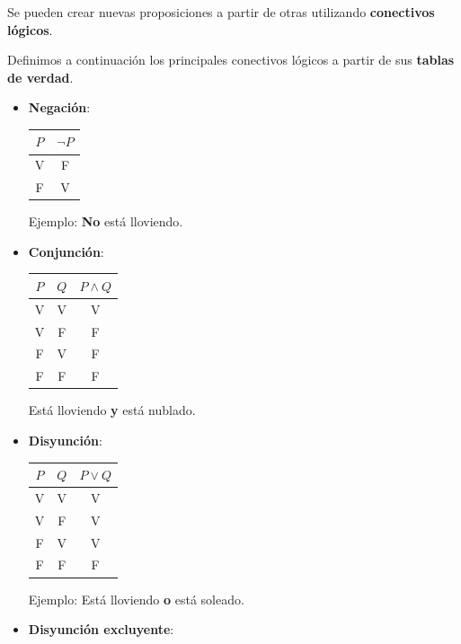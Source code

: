 \begin{definition}
Se pueden crear nuevas proposiciones a partir de otras utilizando \textbf{conectivos lógicos}. 

Definimos a continuación los principales conectivos lógicos a partir de sus \textbf{tablas de verdad}. 

\begin{itemize}
\item \textbf{Negación}: 

\begin{tabular}{ |c|c| }
\hline
$P$ & $\neg P$  \\
\hline  
V & F  \\
F & V  \\
\hline
\end{tabular}

Ejemplo: \textbf{No} está lloviendo.

\item \textbf{Conjunción}: 

\begin{tabular}{ |c|c|c| }
\hline
$P$ & $Q$ & $P \wedge Q$  \\
\hline  
V & V & V  \\
V & F & F  \\
F & V & F  \\
F & F & F  \\
\hline
\end{tabular}

Está lloviendo \textbf{y} está nublado.

\item \textbf{Disyunción}: 

\begin{tabular}{ |c|c|c| }
\hline
$P$ & $Q$ & $P \vee Q$  \\
\hline  
V & V & V  \\
V & F & V  \\
F & V & V  \\
F & F & F  \\
\hline
\end{tabular}

Ejemplo: Está lloviendo \textbf{o} está soleado.

\item \textbf{Disyunción excluyente}: 


\end{itemize}
\end{definition}
